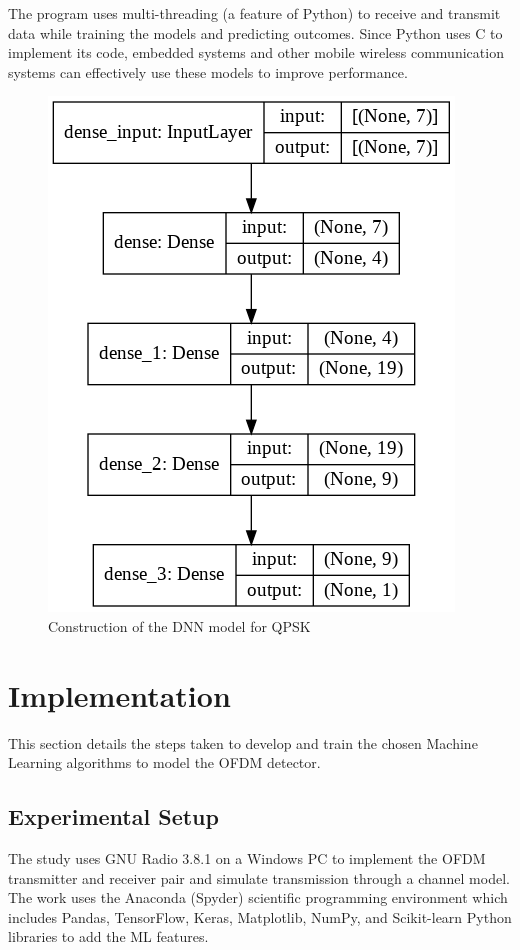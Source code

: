 \documentclass[conference]{IEEEtran}
\begin{document}
The program uses multi-threading (a feature of Python) to receive and transmit data while training the models and predicting outcomes. Since Python uses C to implement its code, embedded systems and other mobile wireless communication systems can effectively use these models to improve performance.

\begin{figure}[htpb]
\centerline{\includegraphics[scale = 0.38]{model_plot.png}}
\caption{Construction of the DNN model for QPSK}
\label{dnn_model_plot}
\end{figure}

\section{Implementation}
This section details the steps taken to develop and train the chosen Machine Learning algorithms to model the OFDM detector.

\subsection{Experimental Setup}
The study uses GNU Radio 3.8.1 on a Windows PC to implement the OFDM transmitter and receiver pair and simulate transmission through a channel model. The work uses the Anaconda (Spyder) scientific programming environment which includes Pandas, TensorFlow, Keras, Matplotlib, NumPy, and Scikit-learn Python libraries to add the ML features.  
\end{document}
